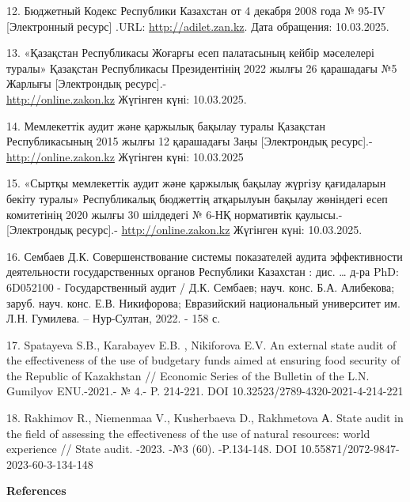 \begin{references}
12. Бюджетный Кодекс Республики Казахстан от 4 декабря 2008 года № 95-IV
{[}Электронный ресурс{]} .URL:
\href{http://adilet.zan.kz/rus/docs/K080000095}{http://adilet.zan.kz}. Дата обращения:
10.03.2025.

13. «Қазақстан Республикасы Жоғарғы есеп палатасының кейбір мәселелері
туралы» Қазақстан Республикасы Президентінің 2022 жылғы 26 қарашадағы
№5 Жарлығы {[}Электрондық ресурс{]}.- \\\href{http://online.zakon.kz/}{http://online.zakon.kz} Жүгінген
күні: 10.03.2025.

14. Мемлекеттік аудит және қаржылық бақылау туралы Қазақстан
Республикасының 2015 жылғы 12 қарашадағы Заңы {[}Электрондық
ресурс{]}.- \href{http://online.zakon.kz/}{http://online.zakon.kz} Жүгінген күні: 10.03.2025

15. «Сыртқы мемлекеттік аудит және қаржылық бақылау жүргізу қағидаларын
бекіту туралы» Республикалық бюджеттің атқарылуын бақылау жөніндегі
есеп комитетінің 2020 жылғы 30 шілдедегі № 6-НҚ нормативтік
қаулысы.-{[}Электрондық ресурс{]}.- \href{http://online.zakon.kz/}{http://online.zakon.kz}
Жүгінген күні: 10.03.2025.

16. Сембаев Д.К. Совершенствование системы показателей аудита
эффективности деятельности государственных органов Республики
Казахстан : дис. \ldots{} д-ра PhD: 6D052100 - Государственный аудит /
Д.К. Сембаев; науч. конс. Б.А. Алибекова; заруб. науч. конс. Е.В.
Никифорова; Евразийский национальный университет им. Л.Н. Гумилева. --
Нур-Султан, 2022. - 158 с.

17. Spatayeva S.B., Karabayev E.B. , Nikiforova E.V. An external state
audit of the effectiveness of the use of budgetary funds aimed at
ensuring food security of the Republic of Kazakhstan // Economic
Series of the Bulletin of the L.N. Gumilyov ENU.-2021.- № 4.- P.
214-221. DOI 10.32523/2789-4320-2021-4-214-221

18. Rakhimov R., Niemenmaa V., Kusherbaeva D., Rakhmetova А. State audit
in the field of assessing the effectiveness of the use of natural
resources: world experience // State audit. -2023. -№3 (60). -P.134-148.
DOI 10.55871/2072-9847-2023-60-3-134-148
\end{references}

\begin{center}
{\bfseries References}
\end{center}

